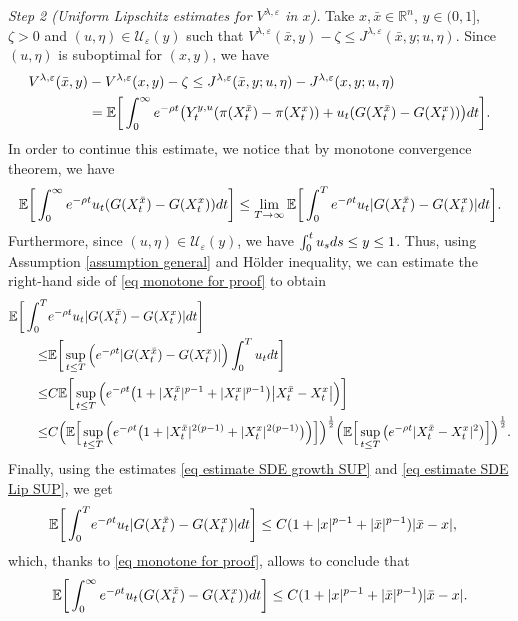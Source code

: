 \documentclass[11pt]{amsart}
\theoremstyle{plain}
\def \dd{{\rm d}}
\numberwithin{equation}{section}
\begin{document}
\smallbreak\noindent
\emph{Step 2 (Uniform Lipschitz estimates for $V^{\lambda, \varepsilon}$ in $x$).}
Take $x, \bar x \in \mathbb R^n$, $y \in (0,1]$, $\zeta >0$ and   $(u,\eta) \in \mathcal U _\varepsilon (y)$  such that $V^{\lambda, \varepsilon}(\bar x, y)  - \zeta 
\leq J^{\lambda, \varepsilon}(\bar x, y;u,\eta )$. 
Since $(u,\eta)$ is suboptimal for $(x,y)$, we have
\begin{equation}\label{eq Lipschit V x first}
\begin{aligned}
V^{\lambda, \varepsilon}(\bar x, y) &- V^{\lambda, \varepsilon}(x,y) - \zeta 
\leq J^{\lambda, \varepsilon}(\bar x, y;u,\eta ) - J^{\lambda, \varepsilon}(x,y;u,\eta) \\
 & = \mathbb E  \bigg[\int_0^\infty e ^{-\rho t} \big( Y^{y,u}_t( \pi (X_t^{\bar x}) - \pi (X_t^x)) + u_t ( G(X_t^{\bar x}) - G(X_t^x)) \big) \dd t \bigg].
\end{aligned}
\end{equation}
In order to continue this estimate, we notice that by monotone convergence theorem, we have
\begin{equation}\label{eq monotone for proof}
 \mathbb E  \bigg[ \int_0^\infty e ^{-\rho t}  u_t ( G(X_t^{\bar x}) - G(X_t^x)) \dd t \bigg] \leq \lim_{T \to \infty}
 \mathbb E  \bigg[ \int_0^T e ^{-\rho t}  u_t | G(X_t^{\bar x}) - G(X_t^x)| \dd t \bigg]. 
\end{equation}
Furthermore,  since $(u,\eta) \in \mathcal U _\varepsilon (y)$, we have $\int_0^t u_s \dd s \leq y \leq 1$. 
Thus, using Assumption \ref{assumption general} and Hölder inequality,  we can estimate the right-hand side of \eqref{eq monotone for proof} to obtain
$$
\begin{aligned}
\mathbb E  \bigg[ \int_0^T & e ^{-\rho t}  u_t | G(X_t^{\bar x}) - G(X_t^x)| \dd t \bigg] \\
\leq & \mathbb E  \bigg[ \sup_{t \leq T} \Big( e ^{-\rho t}  | G(X_t^{\bar x}) - G(X_t^x)| \Big)  \int_0^T u_t  \dd t \bigg] \\
 \leq &  C \mathbb{E} \bigg[ \sup_{t \leq T} \Big( e^{-\rho t} 
\big(1+ |  X ^{\bar x}_t |^{p-1} + | X_t^{x}  |^{p-1} \big) \big|  X ^{\bar x}_t- X^{x }_t \big| \Big) \bigg] \\
 \leq &  C   \Big( \mathbb E \Big[ \sup_{t \leq T} \Big( e ^{-\rho t} \big( 1 +   | X ^{\bar x }_t|^{2(p-1)}  +  | X ^{x }_t|^{2(p-1)} \big) \Big) \Big] \Big)^{\frac12} \Big( \mathbb E \Big[ \sup_{t \leq T} \big( e ^{-\rho t} |  X ^{\bar x}_t -  X ^{x}_t |^2 \big) \Big]  \Big)^{\frac12}.
\end{aligned}
$$
Finally, using the estimates  \eqref{eq estimate SDE growth SUP} and \eqref{eq estimate SDE Lip SUP}, we get
$$
\begin{aligned}
\mathbb E  \bigg[ \int_0^T & e ^{-\rho t}  u_t | G(X_t^{\bar x}) - G(X_t^x)| \dd t \bigg] \leq C (1 + |x|^{p-1} + |\bar x|^{p-1}) |\bar x - x|,
\end{aligned}
$$
which, thanks to \eqref{eq monotone for proof}, allows to  conclude that
\begin{equation}\label{eq estimate u G lip in x}
    \mathbb E  \bigg[ \int_0^\infty  e ^{-\rho t}  u_t ( G(X_t^{\bar x}) - G(X_t^x)) \dd t \bigg] \leq C  (1 + |x|^{p-1} + |\bar x|^{p-1})  |\bar x - x|.
\end{equation}
\end{document}
